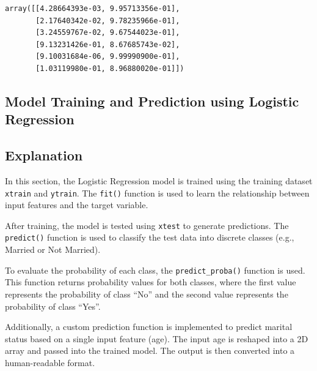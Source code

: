 \documentclass[11pt,a4paper]{report}
\makeatletter
\newcommand{\boxspacing}{\kern\kvtcb@left@rule\kern\kvtcb@boxsep}
\newcommand{\prompt}[4]{
        {\ttfamily\llap{{\color{#2}[#3]:\hspace{3pt}#4}}\vspace{-\baselineskip}}
    }
\makeatother
\begin{document}
            \begin{tcolorbox}[breakable, size=fbox, boxrule=.5pt, pad at break*=1mm, opacityfill=0]
\prompt{Out}{outcolor}{28}{\boxspacing}
\begin{Verbatim}[commandchars=\\\{\}]
array([[4.28664393e-03, 9.95713356e-01],
       [2.17640342e-02, 9.78235966e-01],
       [3.24559767e-02, 9.67544023e-01],
       [9.13231426e-01, 8.67685743e-02],
       [9.10031684e-06, 9.99990900e-01],
       [1.03119980e-01, 8.96880020e-01]])
\end{Verbatim}
\end{tcolorbox}


\subsection{Model Training and Prediction using Logistic Regression}
\subsection*{Explanation}

In this section, the Logistic Regression model is trained using the training dataset \texttt{xtrain} and \texttt{ytrain}. The \texttt{fit()} function is used to learn the relationship between input features and the target variable.

After training, the model is tested using \texttt{xtest} to generate predictions. The \texttt{predict()} function is used to classify the test data into discrete classes (e.g., Married or Not Married).

To evaluate the probability of each class, the \texttt{predict\_proba()} function is used. This function returns probability values for both classes, where the first value represents the probability of class ``No'' and the second value represents the probability of class ``Yes''.

Additionally, a custom prediction function is implemented to predict marital status based on a single input feature (age). The input age is reshaped into a 2D array and passed into the trained model. The output is then converted into a human-readable format.
\end{document}

